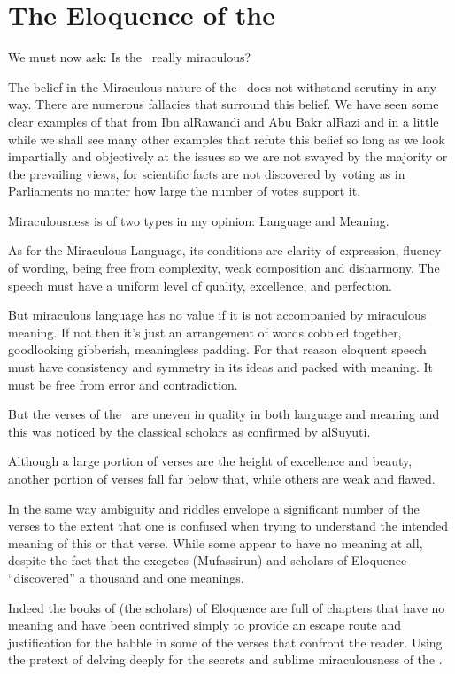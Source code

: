 \documentclass[12pt]{memoir}
\begin{document}
\section{The Eloquence of the \Quran}

We must now ask: Is the \Quran\ really miraculous?

The belief in the Miraculous nature of the \Quran\
does not withstand scrutiny in any way.
There are numerous fallacies that surround this belief.
We have seen some clear examples of that from Ibn al\–Rawandi and
Abu Bakr al\–Razi and in a little while we shall see many other examples
that refute this belief so long as we look impartially and objectively
at the issues so we are not swayed by the majority or the prevailing views,
for scientific facts are not discovered by voting as in Parliaments
no matter how large the number of votes support it.

Miraculousness is of two types in my opinion: Language and Meaning.

As for the Miraculous Language, its conditions are clarity of expression,
fluency of wording, being free from complexity,
weak composition and disharmony.
The speech must have a uniform level of quality, excellence, and perfection.

But miraculous language has no value
if it is not accompanied by miraculous meaning.
If not then it’s just an arrangement of words cobbled together,
good\–looking gibberish, meaningless padding.
For that reason eloquent speech must have consistency and symmetry
in its ideas and packed with meaning.
It must be free from error and contradiction.

But the verses of the \Quran\ are uneven in quality
in both language and meaning and this was noticed
by the classical scholars as confirmed by al\–Suyuti.

Although a large portion of verses are the height of excellence and beauty,
another portion of verses fall far below that,
while others are weak and flawed.

In the same way ambiguity and riddles envelope a significant number of
the verses to the extent that one is confused when trying to understand
the intended meaning of this or that verse.
While some appear to have no meaning at all,
despite the fact that the exegetes (Mufassirun) and
scholars of Eloquence “discovered” a thousand and one meanings.

Indeed the books of (the scholars) of Eloquence are full of chapters
that have no meaning and have been contrived simply to provide an escape
route and justification for the babble in some of the verses
that confront the reader.
Using the pretext of delving deeply for the secrets
and sublime miraculousness of the \Quran.
\end{document}
